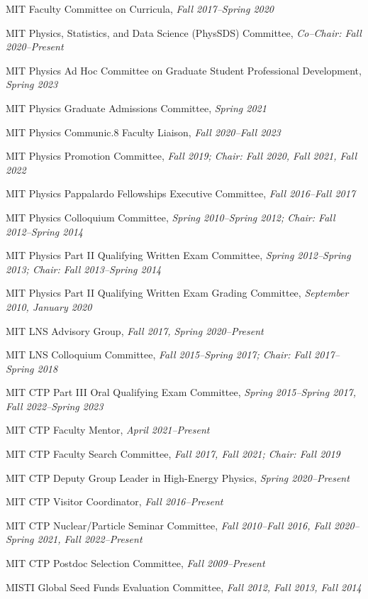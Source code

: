 \bbl
\item MIT Faculty Committee on Curricula, \emph{Fall 2017--Spring 2020}
\item MIT Physics, Statistics, and Data Science (PhysSDS) Committee, \emph{Co--Chair: Fall 2020--Present}
\item MIT Physics Ad Hoc Committee on Graduate Student Professional Development, \emph{Spring 2023}
\item MIT Physics Graduate Admissions Committee, \emph{Spring 2021}
\item MIT Physics Communic.8 Faculty Liaison, \emph{Fall 2020--Fall 2023}
\item MIT Physics Promotion Committee, \emph{Fall 2019; Chair: Fall 2020, Fall 2021, Fall 2022}
\item MIT Physics Pappalardo Fellowships Executive Committee, \emph{Fall 2016--Fall 2017}
\item MIT Physics Colloquium Committee, \emph{Spring 2010--Spring 2012; Chair: Fall 2012--Spring 2014}
\item MIT Physics Part II Qualifying Written Exam Committee, \emph{Spring 2012--Spring 2013; Chair: Fall 2013--Spring 2014}
\item MIT Physics Part II Qualifying Written Exam Grading Committee, \emph{September 2010, January 2020}
\item MIT LNS Advisory Group, \emph{Fall 2017, Spring 2020--Present}
\item MIT LNS Colloquium Committee, \emph{Fall 2015--Spring 2017; Chair: Fall 2017--Spring 2018}
\item MIT CTP Part III Oral Qualifying Exam Committee, \emph{Spring 2015--Spring 2017, Fall 2022--Spring 2023}
\item MIT CTP Faculty Mentor, \emph{April 2021--Present}
\item MIT CTP Faculty Search Committee, \emph{Fall 2017, Fall 2021; Chair: Fall 2019}
\item MIT CTP Deputy Group Leader in High-Energy Physics, \emph{Spring 2020--Present}
\item MIT CTP Visitor Coordinator, \emph{Fall 2016--Present}
\item MIT CTP Nuclear/Particle Seminar Committee, \emph{Fall 2010--Fall 2016, Fall 2020--Spring 2021, Fall 2022--Present}
\item MIT CTP Postdoc Selection Committee, \emph{Fall 2009--Present}
\item MISTI Global Seed Funds Evaluation Committee, \emph{Fall 2012, Fall 2013, Fall 2014}
\el
